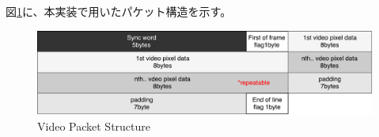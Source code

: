 図\ref{fig:fpga-video-packet}に、本実装で用いたパケット構造を示す。

\begin{figure}[htbp]
    \begin{center}
        \includegraphics[bb=0 0 641 161,width=15.5cm]{img/fpga-video-packet.pdf}
    \end{center}
    \caption{Video Packet Structure}
    \label{fig:fpga-video-packet}
\end{figure}

